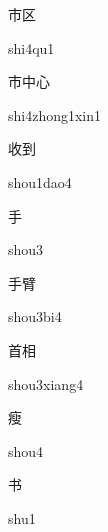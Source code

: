 \begin{multicols*}{2}
\begin{verbete}[shi4qu1]{市区}
\begin{pronuncia}{shi4qu1}
\end{pronuncia}
\end{verbete}

\begin{verbete}{市中心}
\begin{pronuncia}{shi4zhong1xin1}
\end{pronuncia}
\end{verbete}

\begin{verbete}{收到}
\begin{pronuncia}{shou1dao4}
\end{pronuncia}
\end{verbete}

\begin{verbete}[shou3]{手}
\begin{pronuncia}{shou3}
\end{pronuncia}
\end{verbete}

\begin{verbete}[shou3bi4]{手臂}
\begin{pronuncia}{shou3bi4}
\end{pronuncia}
\end{verbete}

\begin{verbete}{首相}
\begin{pronuncia}{shou3xiang4}
\end{pronuncia}
\end{verbete}

\begin{verbete}[shou4]{瘦}
\begin{pronuncia}{shou4}
\end{pronuncia}
\end{verbete}

\begin{verbete}[shu1]{书}
\begin{pronuncia}{shu1}
\end{pronuncia}
\end{verbete}


\end{multicols*}
